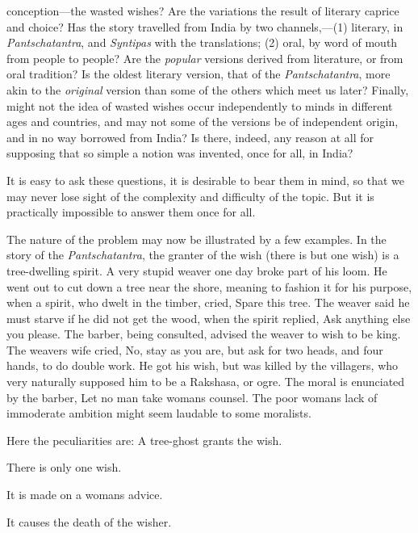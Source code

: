 \documentclass[14pt,a4paper]{memoir}
\begin{document}
{conception---the wasted wishes? Are the variations the result of
literary caprice and choice? Has the story travelled from India by two
channels,---(1) literary, in \emph{Pantschatantra}, and \emph{Syntipas}
with the translations; (2) oral, by word of mouth from people to people?
Are the \emph{popular} versions derived from literature, or from oral
tradition? Is the oldest literary version, that of the
\emph{Pantschatantra}, more akin to the \emph{original} version than
some of the others which meet us later? Finally, might not the idea of
wasted wishes occur independently to minds in different ages and
countries, and may not some of the versions be of independent origin,
and in no way borrowed from India? Is there, indeed, any reason at all
for supposing that so simple a notion was invented, once for all, in
India?

It is easy to ask these questions, it is desirable to bear them in mind,
so that we may never lose sight of the complexity and difficulty of the
topic. But it is practically impossible to answer them once for all.

The nature of the problem may now be illustrated by a few examples. In
the story of the \emph{Pantschatantra}, the granter of the wish (there
is but one wish) is a tree-dwelling spirit. A very stupid weaver one day
broke part of his loom. He went out to cut down a tree near the shore,
meaning to fashion it for his purpose, when a spirit, who dwelt in the
timber, cried, \textquotesingle Spare this tree.\textquotesingle{} The
weaver said he must starve if he did not get the wood, when the spirit
replied, \textquotesingle Ask anything else you
please.\textquotesingle{} The barber, being consulted, advised the
weaver to wish to be king. The weaver\textquotesingle s wife cried,
\textquotesingle No, stay as you are, but ask for two heads, and four
hands, to do double work.\textquotesingle{} He got his wish, but was
killed by the villagers, who very naturally supposed him to be a
Rakshasa, or ogre. The moral is enunciated by the barber,
\textquotesingle Let no man take woman\textquotesingle s
counsel.\textquotesingle{} The poor woman\textquotesingle s lack of
immoderate ambition might seem laudable to some moralists.

Here the peculiarities are: A tree-ghost grants the wish.

There is only one wish.

It is made on a woman\textquotesingle s advice.

It causes the death of the
wisher.

}
\end{document}
